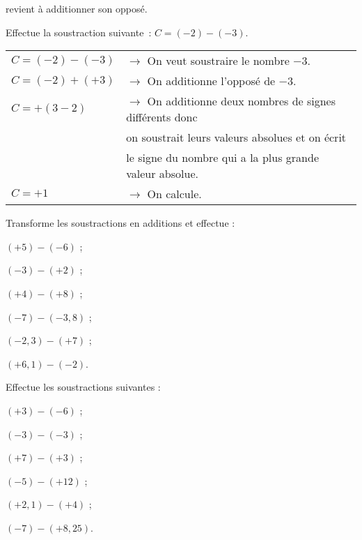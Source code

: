 \begin{methode*1}
 \end{methode*1}


\begin{methode*1}

\begin{aconnaitre}
 revient à additionner son opposé.
\end{aconnaitre}

 \begin{exemple*1}
Effectue la soustraction suivante : $C = (- 2) - (- 3)$.
\begin{tabular}{ll} 
$C = (- 2) - (- 3)$ & $\rightarrow$ On veut soustraire le nombre $- 3$. \\
$C = (- 2) + (+ 3)$ & $\rightarrow$ On additionne l'opposé de $- 3$. \\
$C = + (3 - 2)$ & $\rightarrow$ On additionne deux nombres de signes différents donc \\
 & \phantom{$\rightarrow$} on soustrait leurs valeurs absolues et on écrit \\
 & \phantom{$\rightarrow$} le signe du nombre qui a la plus grande valeur absolue. \\
$C = + 1$ & $\rightarrow$ On calcule. \\
\end{tabular}
 \end{exemple*1}

\exercice
Transforme les soustractions en additions et effectue :
\begin{colenumerate}{2}
 \item $(+ 5) - (- 6)$ ;
 \item $(- 3) - (+ 2)$ ;
 \item $(+ 4) - (+ 8)$ ;
 \item $(- 7) - (- 3,8)$ ;
 \item $(- 2,3) - (+ 7)$ ;
 \item $(+ 6,1) - (- 2)$.
 \end{colenumerate}

\exercice
Effectue les soustractions suivantes :
\begin{colenumerate}{2}
 \item $(+ 3) - (- 6)$ ;
 \item $(- 3) - (- 3)$ ;
 \item $(+ 7) - (+ 3)$ ;
 \item $(- 5) - (+ 12)$ ;
 \item $(+ 2,1) - (+ 4)$ ;
 \item $(- 7) - (+ 8,25)$.
 \end{colenumerate}

 \end{methode*1}
 
